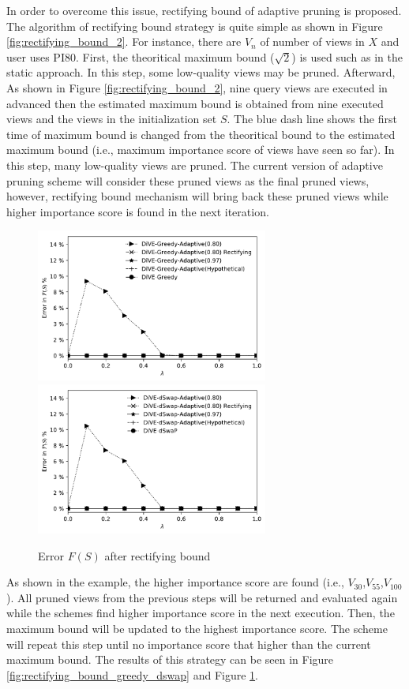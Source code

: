 \documentclass{article}
\begin{document}
In order to overcome this issue, rectifying bound of adaptive pruning is proposed. The algorithm of rectifying bound strategy is quite simple as shown in Figure \ref{fig:rectifying_bound_2}. For instance, there are $V_n$ of number of views in $X$ and user uses PI80. First, the theoritical maximum bound ($ \sqrt{2} $) is used such as in the static approach. In this step, some low-quality views may be pruned. Afterward, As shown in Figure \ref{fig:rectifying_bound_2}, nine query views are executed in advanced then the estimated maximum bound is obtained from nine executed views and the views in the initialization set $S$. The blue dash line shows the first time of maximum bound is changed from the theoritical bound to the estimated maximum bound (i.e., maximum importance score of views have seen so far). In this step, many low-quality views are pruned. The current version of adaptive pruning scheme will consider these pruned views as the final pruned views, however, rectifying bound mechanism will bring back these pruned views while higher importance score is found in the next iteration. 
\begin{figure}
	\begin{center}
		\includegraphics[width=3.0in]{figures/rectifiying_error_f_s_greedy}
		\includegraphics[width=3.0in]{figures/rectifiying_error_f_s_dswap}
		\caption{Error $F(S)$ after rectifying bound}
		\label{fig:error_fs_adaptive}
	\end{center}
\end{figure}

As shown in the example, the higher importance score are found (i.e., $V_{30}$,$V_{55}$,$V_{100}$). All pruned views from the previous steps will be returned and evaluated again while the schemes find higher importance score in the next execution. Then, the maximum bound will be updated to the highest importance score. The scheme will repeat this step until no importance score that higher than the current maximum bound. The results of this strategy can be seen in Figure \ref{fig:rectifying_bound_greedy_dswap} and Figure \ref{fig:error_fs_adaptive}. 
\end{document}
